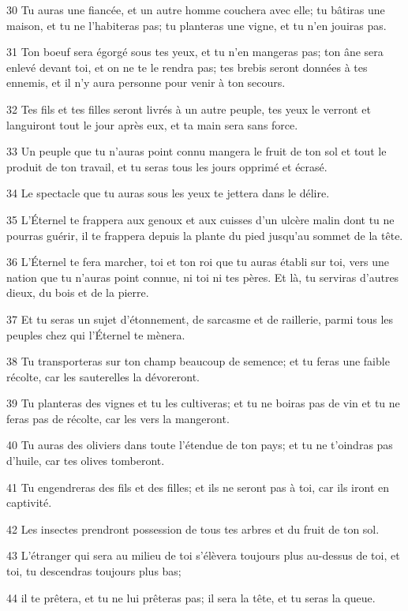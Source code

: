\par 30 Tu auras une fiancée, et un autre homme couchera avec elle; tu bâtiras une maison, et tu ne l'habiteras pas; tu planteras une vigne, et tu n'en jouiras pas.
\par 31 Ton boeuf sera égorgé sous tes yeux, et tu n'en mangeras pas; ton âne sera enlevé devant toi, et on ne te le rendra pas; tes brebis seront données à tes ennemis, et il n'y aura personne pour venir à ton secours.
\par 32 Tes fils et tes filles seront livrés à un autre peuple, tes yeux le verront et languiront tout le jour après eux, et ta main sera sans force.
\par 33 Un peuple que tu n'auras point connu mangera le fruit de ton sol et tout le produit de ton travail, et tu seras tous les jours opprimé et écrasé.
\par 34 Le spectacle que tu auras sous les yeux te jettera dans le délire.
\par 35 L'Éternel te frappera aux genoux et aux cuisses d'un ulcère malin dont tu ne pourras guérir, il te frappera depuis la plante du pied jusqu'au sommet de la tête.
\par 36 L'Éternel te fera marcher, toi et ton roi que tu auras établi sur toi, vers une nation que tu n'auras point connue, ni toi ni tes pères. Et là, tu serviras d'autres dieux, du bois et de la pierre.
\par 37 Et tu seras un sujet d'étonnement, de sarcasme et de raillerie, parmi tous les peuples chez qui l'Éternel te mènera.
\par 38 Tu transporteras sur ton champ beaucoup de semence; et tu feras une faible récolte, car les sauterelles la dévoreront.
\par 39 Tu planteras des vignes et tu les cultiveras; et tu ne boiras pas de vin et tu ne feras pas de récolte, car les vers la mangeront.
\par 40 Tu auras des oliviers dans toute l'étendue de ton pays; et tu ne t'oindras pas d'huile, car tes olives tomberont.
\par 41 Tu engendreras des fils et des filles; et ils ne seront pas à toi, car ils iront en captivité.
\par 42 Les insectes prendront possession de tous tes arbres et du fruit de ton sol.
\par 43 L'étranger qui sera au milieu de toi s'élèvera toujours plus au-dessus de toi, et toi, tu descendras toujours plus bas;
\par 44 il te prêtera, et tu ne lui prêteras pas; il sera la tête, et tu seras la queue.
